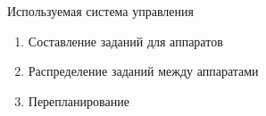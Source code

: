 \documentclass{beamer}
\begin{document}
\begin{frame}{Используемая система управления}

\begin{enumerate}
\item Составление заданий для аппаратов
\item Распределение заданий между аппаратами

\item Перепланирование


\end{enumerate}
\end{frame}
\end{document}
